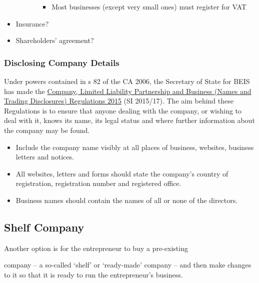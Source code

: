 \documentclass[
]{article}
\providecommand{\tightlist}{%
  \setlength{\itemsep}{0pt}\setlength{\parskip}{0pt}}
\begin{document}
\begin{itemize}
\begin{itemize}
\begin{itemize}
      \begin{itemize}
      \tightlist
      \item
        Most businesses (except very small ones) must register for VAT
      \end{itemize}
    \end{itemize}
  \end{itemize}
\item
  Insurance?
\item
  Shareholders' agreement?
\end{itemize}

\hypertarget{disclosing-company-details}{%
\subsubsection{Disclosing Company
Details}\label{disclosing-company-details}}

Under powers contained in s 82 of the CA 2006, the Secretary of State
for BEIS has made the
\href{https://www.legislation.gov.uk/uksi/2015/17/contents/made}{Company,
Limited Liability Partnership and Business (Names and Trading
Disclosures) Regulations 2015} (SI 2015/17). The aim behind these
Regulations is to ensure that anyone dealing with the company, or
wishing to deal with it, knows its name, its legal status and where
further information about the company may be found.

\begin{itemize}
\tightlist
\item
  Include the company name visibly at all places of business, websites,
  business letters and notices.
\item
  All websites, letters and forms should state the company's country of
  registration, registration number and registered office.
\item
  Business names should contain the names of all or none of the
  directors.
\end{itemize}

\hypertarget{shelf-company}{%
\subsection{Shelf Company}\label{shelf-company}}

Another option is for the entrepreneur to buy a pre-existing

company -- a so-called `shelf' or `ready-made' company -- and then make
changes to it so that it is ready to run the entrepreneur's business.
\end{document}
